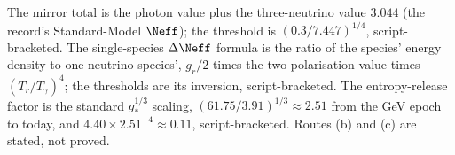 The mirror total is the photon value plus the three-neutrino value $3.044$ (the record's Standard-Model $\Neff$); the threshold is $(0.3/7.447)^{1/4}$, script-bracketed. The single-species $\Delta\Neff$ formula is the ratio of the species' energy density to one neutrino species', $g_{r}/2$ times the two-polarisation value times $(T_{r}/T_{\gamma})^{4}$; the thresholds are its inversion, script-bracketed. The entropy-release factor is the standard $g_{*}^{1/3}$ scaling, $(61.75/3.91)^{1/3} \approx 2.51$ from the GeV epoch to today, and $4.40 \times 2.51^{-4} \approx 0.11$, script-bracketed. Routes (b) and (c) are stated, not proved.
